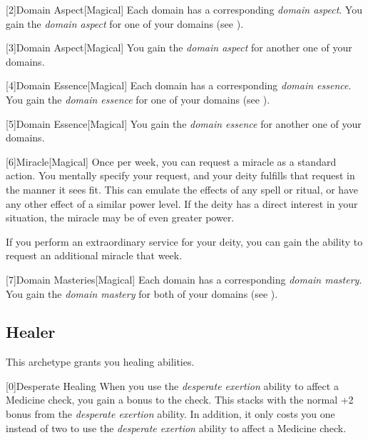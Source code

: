         [2]{Domain Aspect}[Magical]
        Each domain has a corresponding \textit{domain aspect}.
        You gain the \textit{domain aspect} for one of your domains (see ).

        [3]{Domain Aspect}[Magical]
        You gain the \textit{domain aspect} for another one of your domains.

        [4]{Domain Essence}[Magical]
        Each domain has a corresponding \textit{domain essence}.
        You gain the \textit{domain essence} for one of your domains (see ).

        [5]{Domain Essence}[Magical]
        You gain the \textit{domain essence} for another one of your domains.

        [6]{Miracle}[Magical]
        Once per week, you can request a miracle as a standard action.
        You mentally specify your request, and your deity fulfills that request in the manner it sees fit.
        This can emulate the effects of any spell or ritual, or have any other effect of a similar power level.
        If the deity has a direct interest in your situation, the miracle may be of even greater power.

        If you perform an extraordinary service for your deity, you can gain the ability to request an additional miracle that week.

        [7]{Domain Masteries}[Magical]
        Each domain has a corresponding \textit{domain mastery}.
        You gain the \textit{domain mastery} for both of your domains (see ).

    \newpage
    \subsection{Healer}
        This archetype grants you healing abilities.

        [0]{Desperate Healing} When you use the \textit{desperate exertion} ability to affect a Medicine check, you gain a  bonus to the check.
        This stacks with the normal +2 bonus from the \textit{desperate exertion} ability.
        In addition, it only costs you one  instead of two to use the \textit{desperate exertion} ability to affect a Medicine check.

